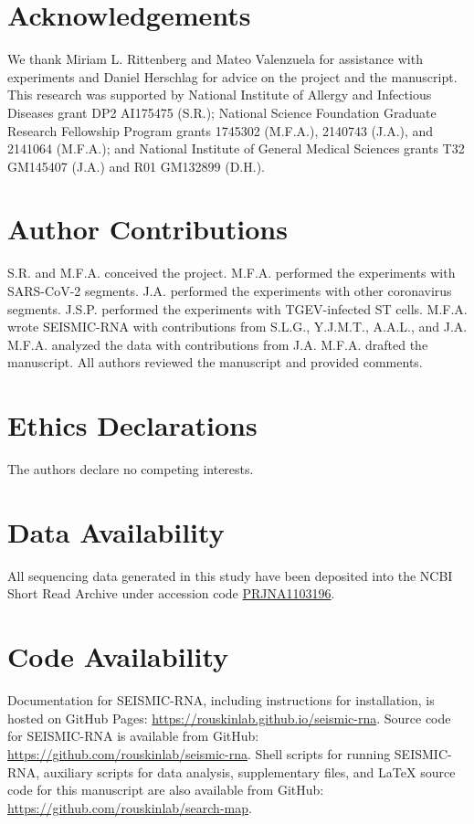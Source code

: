 \documentclass[main.tex]{subfiles}
\begin{document}
\section{Acknowledgements}

We thank Miriam L. Rittenberg and Mateo Valenzuela for assistance with experiments and Daniel Herschlag for advice on the project and the manuscript.
This research was supported by National Institute of Allergy and Infectious Diseases grant DP2 AI175475 (S.R.); National Science Foundation Graduate Research Fellowship Program grants 1745302 (M.F.A.), 2140743 (J.A.), and 2141064 (M.F.A.); and National Institute of General Medical Sciences grants T32 GM145407 (J.A.) and R01 GM132899 (D.H.).


\section{Author Contributions}

S.R. and M.F.A. conceived the project.
M.F.A. performed the experiments with SARS-CoV-2 segments.
J.A. performed the experiments with other coronavirus segments.
J.S.P. performed the experiments with TGEV-infected ST cells.
M.F.A. wrote SEISMIC-RNA with contributions from S.L.G., Y.J.M.T., A.A.L., and J.A.
M.F.A. analyzed the data with contributions from J.A.
M.F.A. drafted the manuscript.
All authors reviewed the manuscript and provided comments.


\section{Ethics Declarations}

The authors declare no competing interests.


\section{Data Availability}

All sequencing data generated in this study have been deposited into the NCBI Short Read Archive under accession code \href{https://www.ncbi.nlm.nih.gov/bioproject/PRJNA1103196}{PRJNA1103196}.


\section{Code Availability}

Documentation for SEISMIC-RNA, including instructions for installation, is hosted on GitHub Pages: \url{https://rouskinlab.github.io/seismic-rna}.
Source code for SEISMIC-RNA is available from GitHub: \url{https://github.com/rouskinlab/seismic-rna}. 
Shell scripts for running SEISMIC-RNA, auxiliary scripts for data analysis, supplementary files, and LaTeX source code for this manuscript are also available from GitHub: \url{https://github.com/rouskinlab/search-map}.
\end{document}

